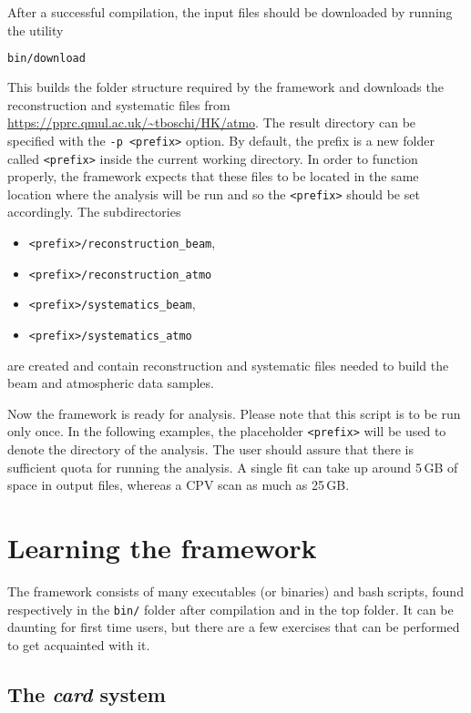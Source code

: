 \documentclass[a4paper, 11pt]{article}
\begin{document}
After a successful compilation, the input files should be downloaded by running the utility
\begin{lstlisting}[language=bash]
    bin/download
\end{lstlisting}
This builds the folder structure required by the framework and downloads the reconstruction %
and systematic files from \url{https://pprc.qmul.ac.uk/~tboschi/HK/atmo}.
The result directory can be specified with the \texttt{-p <prefix>} option.
By default, the prefix is a new folder called \texttt{<prefix>} inside the current working directory.
In order to function properly, the framework expects that these files to be located in the same %
location where the analysis will be run and so the \texttt{<prefix>} should be set accordingly.
The subdirectories
\begin{itemize}
		\small
	\item \texttt{<prefix>/reconstruction\_beam},
	\item \texttt{<prefix>/reconstruction\_atmo}
	\item \texttt{<prefix>/systematics\_beam},
	\item \texttt{<prefix>/systematics\_atmo}
\end{itemize}
are created and contain reconstruction and systematic files %
needed to build the beam and atmospheric data samples.

Now the framework is ready for analysis. Please note that this script is to be run only once.
In the following examples, the placeholder \texttt{<prefix>} will be used %
to denote the directory of the analysis.
The user should assure that there is sufficient quota for running the analysis.
A single fit can take up around 5\,GB of space in output files, whereas a CPV scan %
as much as 25\,GB.

\section{Learning the framework}

The framework consists of many executables (or binaries) and bash scripts, %
found respectively in the \texttt{bin/} folder after compilation and in the top folder.
It can be daunting for first time users, but there are a few exercises that can be performed %
to get acquainted with it.

\subsection{The \emph{card} system}
\end{document}
